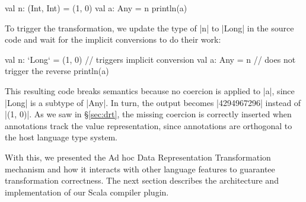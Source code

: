\begin{lstlisting-nobreak}
val n: (Int, Int) = (1, 0)
val a: Any = n
println(a)
\end{lstlisting-nobreak}

\noindent
To trigger the transformation, we update the type of |n| to |Long| in the source code and wait for the implicit conversions to do their work:

\begin{lstlisting-nobreak}
val n: `Long` = (1, 0) // triggers implicit conversion
val a: Any = n              // does not trigger the reverse
println(a)
\end{lstlisting-nobreak}

This resulting code breaks semantics because no coercion is applied to |a|, since |Long| is a subtype of |Any|. In turn, the output becomes |4294967296| instead of |(1, 0)|. As we saw in \S\ref{sec:drt}, the missing coercion is correctly inserted when annotations track the value representation, since annotations are orthogonal to the host language type system.

With this, we presented the Ad hoc Data Representation Transformation mechanism and how it interacts with other language features to guarantee transformation correctness. The next section describes the architecture and implementation of our Scala compiler plugin. 



